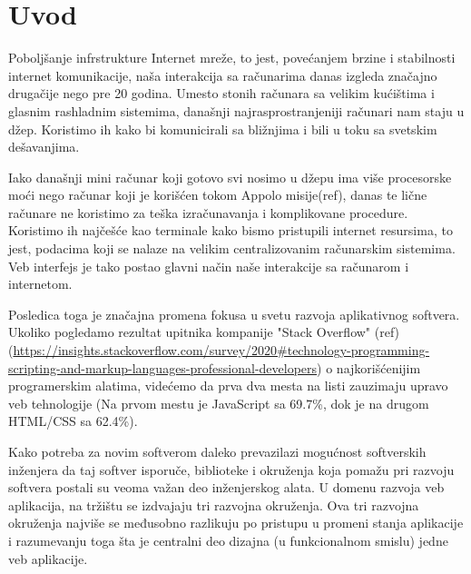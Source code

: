 \documentclass[12pt,oneside]{memoir}
\begin{document}
\frontmatter
\naslovna
\komisija
\apstrakt
\tableofcontents*

\mainmatter

\chapter{Uvod}
Poboljšanje infrstrukture Internet mreže, to jest, povećanjem brzine i stabilnosti internet komunikacije,
naša interakcija sa računarima danas izgleda značajno drugačije nego pre 20 godina. Umesto stonih računara sa velikim kućištima i glasnim rashladnim sistemima,
današnji najrasprostranjeniji računari nam staju u džep. Koristimo ih kako bi komunicirali sa bližnjima i bili u toku sa svetskim dešavanjima.

Iako današnji mini računar koji gotovo svi nosimo u džepu ima više procesorske moći nego računar koji je korišćen tokom Appolo misije(ref), 
danas te lične računare ne koristimo za teška izračunavanja i komplikovane procedure. Koristimo ih najčešće kao terminale kako bismo pristupili internet resursima,
to jest, podacima koji se nalaze na velikim centralizovanim računarskim sistemima. Veb interfejs je tako postao glavni način naše interakcije sa računarom i internetom.

Posledica toga je značajna promena fokusa u svetu razvoja aplikativnog softvera. Ukoliko pogledamo rezultat upitnika kompanije "Stack Overflow" (ref)({\url{https://insights.stackoverflow.com/survey/2020#technology-programming-scripting-and-markup-languages-professional-developers}}) o najkorišćenijim programerskim alatima, videćemo da prva dva mesta na listi
zauzimaju upravo veb tehnologije (Na prvom mestu je JavaScript sa 69.7\%, dok je na drugom HTML/CSS sa 62.4\%).

Kako potreba za novim softverom daleko prevazilazi mogućnost softverskih inženjera da taj softver isporuče, biblioteke i okruženja koja pomažu pri razvoju softvera postali su veoma važan deo inženjerskog alata.
U domenu razvoja veb aplikacija, na tržištu se izdvajaju tri razvojna okruženja. Ova tri razvojna okruženja najviše se međusobno razlikuju po pristupu u promeni stanja aplikacije i razumevanju
toga šta je centralni deo dizajna (u funkcionalnom smislu) jedne veb aplikacije.
\end{document}
